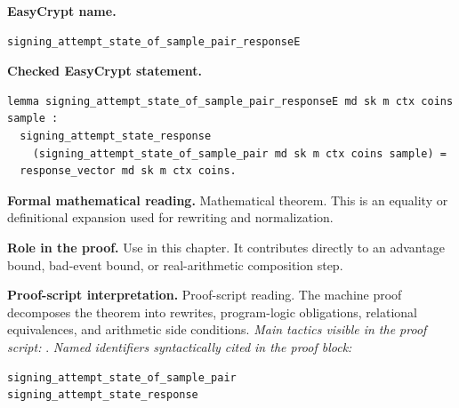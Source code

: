 \begin{formaltheorem}
\noindent\textbf{EasyCrypt name.}
\begin{lstlisting}[language=EasyCrypt,basicstyle=\ttfamily\scriptsize]
signing_attempt_state_of_sample_pair_responseE
\end{lstlisting}
\noindent\textbf{Checked EasyCrypt statement.}
\begin{lstlisting}[language=EasyCrypt,basicstyle=\ttfamily\scriptsize]
lemma signing_attempt_state_of_sample_pair_responseE md sk m ctx coins sample :
  signing_attempt_state_response
    (signing_attempt_state_of_sample_pair md sk m ctx coins sample) =
  response_vector md sk m ctx coins.
\end{lstlisting}
\noindent\textbf{Formal mathematical reading.}
Mathematical theorem. This is an equality or definitional expansion used for rewriting and normalization.

\noindent\textbf{Role in the proof.}
Use in this chapter. It contributes directly to an advantage bound, bad-event bound, or real-arithmetic composition step.

\noindent\textbf{Proof-script interpretation.}
Proof-script reading. The machine proof decomposes the theorem into rewrites, program-logic obligations, relational equivalences, and arithmetic side conditions.
\emph{Main tactics visible in the proof script:} .
\emph{Named identifiers syntactically cited in the proof block:}
\begin{lstlisting}[language=EasyCrypt,basicstyle=\ttfamily\scriptsize]
signing_attempt_state_of_sample_pair
signing_attempt_state_response
\end{lstlisting}

\end{formaltheorem}

